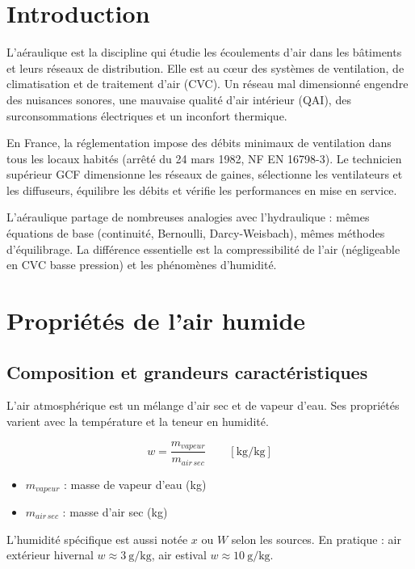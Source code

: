 \section{Introduction}

L'aéraulique est la discipline qui étudie les écoulements d'air dans les bâtiments et leurs réseaux de distribution. Elle est au cœur des systèmes de ventilation, de climatisation et de traitement d'air (CVC). Un réseau mal dimensionné engendre des nuisances sonores, une mauvaise qualité d'air intérieur (QAI), des surconsommations électriques et un inconfort thermique.

En France, la réglementation impose des débits minimaux de ventilation dans tous les locaux habités (arrêté du 24 mars 1982, NF EN 16798-3). Le technicien supérieur GCF dimensionne les réseaux de gaines, sélectionne les ventilateurs et les diffuseurs, équilibre les débits et vérifie les performances en mise en service.

L'aéraulique partage de nombreuses analogies avec l'hydraulique : mêmes équations de base (continuité, Bernoulli, Darcy-Weisbach), mêmes méthodes d'équilibrage. La différence essentielle est la compressibilité de l'air (négligeable en CVC basse pression) et les phénomènes d'humidité.

\section{Propriétés de l'air humide}

\subsection{Composition et grandeurs caractéristiques}

L'air atmosphérique est un mélange d'air sec et de vapeur d'eau. Ses propriétés varient avec la température et la teneur en humidité.

\begin{definition}[title=Humidité spécifique (teneur en eau)]
\begin{equation}
  w = \frac{m_{vapeur}}{m_{air\,sec}} \qquad \left[\si{\kilogram\per\kilogram}\right]
\end{equation}
\begin{itemize}
  \item $m_{vapeur}$ : masse de vapeur d'eau (\si{\kilogram})
  \item $m_{air\,sec}$ : masse d'air sec (\si{\kilogram})
\end{itemize}
L'humidité spécifique est aussi notée $x$ ou $W$ selon les sources. En pratique : air extérieur hivernal $w \approx \SI{3}{\gram\per\kilogram}$, air estival $w \approx \SI{10}{\gram\per\kilogram}$.
\end{definition}

